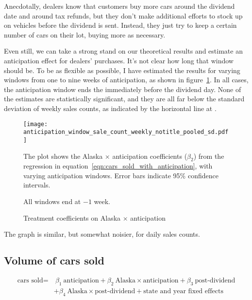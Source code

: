 \documentclass[11pt,letterpaper,oneside]{article}
\newcommand{\snippet}[1]{\hspace{-0.15em}}
\begin{document}
Anecdotally, dealers know that customers buy more cars around the dividend date and around tax refunds, but they don't make additional efforts to stock up on vehicles before the dividend is sent.
Instead, they just try to keep a certain number of cars on their lot, buying more as necessary.

Even still, we can take a strong stand on our theoretical results and estimate an anticipation effect for dealers' purchases.
It's not clear how long that window should be.
To be as flexible as possible, I have estimated the results for varying windows from one to nine weeks of anticipation, as shown in figure~\ref{fig:anticipation_window_sale_count}.
In all cases, the anticipation window ends the immediately before the dividend day.
None of the estimates are statistically significant, and they are all far below the standard deviation of weekly sales counts, as indicated by the horizontal line at \snippet{}.



\begin{figure}[hbt]
    \caption{Treatment coefficients on Alaska $\times$ anticipation}
    \label{fig:anticipation_window_sale_count}
    \texttt{[image: anticipation\_window\_sale\_count\_weekly\_notitle\_pooled\_sd.pdf]}

    {\footnotesize
    The plot shows the Alaska $\times$ anticipation coefficients ($\beta_2$) from the regression in equation~\ref{eqn:cars_sold_with_anticipation}, with varying anticipation windows.
    Error bars indicate 95\% confidence intervals.

    All windows end at $-1$ week.
    }
\end{figure}


The graph is similar, but somewhat noisier, for daily sales counts.




\subsection{Volume of cars sold}

\begin{align}
    \label{eqn:cars_sold_with_anticipation}
    \text{cars sold} = & \ \beta_1 \ \text{anticipation} + \beta_2 \ \text{Alaska} \times \text{anticipation} + \beta_3 \ \text{post-dividend} \\ \nonumber
    &+ \beta_4 \ \text{Alaska} \times \text{post-dividend} + \text{state and year fixed effects}
\end{align}
\end{document}
